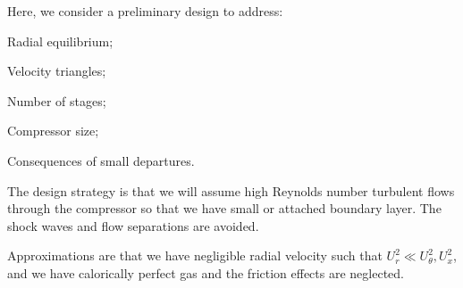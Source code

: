 Here, we consider a preliminary design to address:
\begin{itemizePacked}
\item Radial equilibrium;
\item Velocity triangles;
\item Number of stages;
\item Compressor size;
\item Consequences of small departures.
\end{itemizePacked}

The design strategy is that we will assume high Reynolds number turbulent flows through the compressor so that we have small or attached boundary layer. The shock waves and flow separations are avoided.

Approximations are that we have negligible radial velocity such that $U_r^2 \ll U_\theta^2, U_x^2$, and we have calorically perfect gas and the friction effects are neglected.

